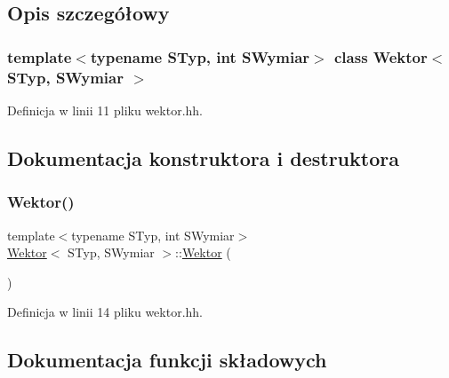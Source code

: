 \subsection{Opis szczegółowy}
\subsubsection*{template$<$typename S\+Typ, int S\+Wymiar$>$\newline
class Wektor$<$ S\+Typ, S\+Wymiar $>$}



Definicja w linii 11 pliku wektor.\+hh.



\subsection{Dokumentacja konstruktora i destruktora}
\mbox{\label{class_wektor_aa8478acaedd4ab9cb23dc803d779e19c}} 
\subsubsection{\texorpdfstring{Wektor()}{Wektor()}}
{\footnotesize\ttfamily template$<$typename S\+Typ, int S\+Wymiar$>$ \\
\mbox{\hyperlink{class_wektor}{Wektor}}$<$ S\+Typ, S\+Wymiar $>$\+::\mbox{\hyperlink{class_wektor}{Wektor}} (\begin{DoxyParamCaption}{ }\end{DoxyParamCaption})\hspace{0.3cm}{\ttfamily [inline]}}



Definicja w linii 14 pliku wektor.\+hh.



\subsection{Dokumentacja funkcji składowych}
\mbox{\label{class_wektor_a8bdafe74616e16b690feee6844423d50}} 
